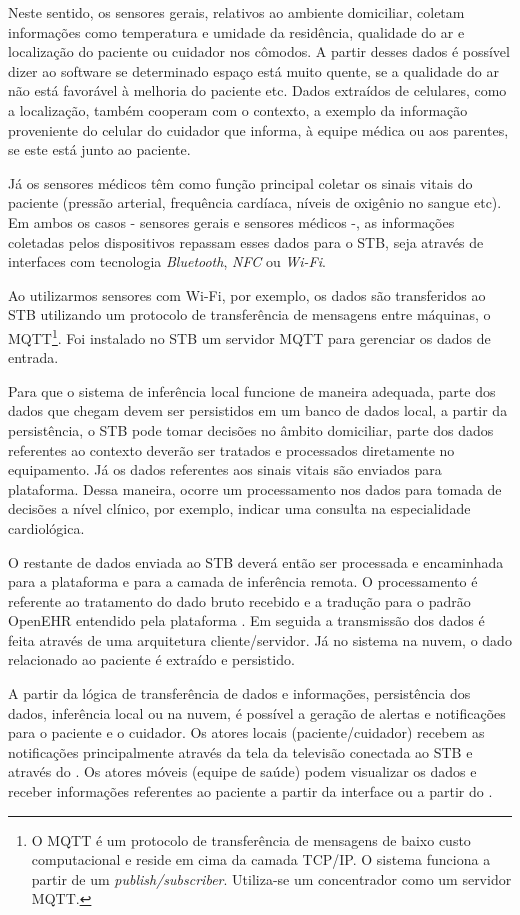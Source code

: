 Neste sentido, os sensores gerais, relativos ao ambiente domiciliar, coletam
informações como  temperatura e umidade da residência, qualidade do ar e
localização do paciente ou cuidador nos cômodos. A partir desses dados é
possível dizer ao software se determinado espaço está muito quente, se a
qualidade do ar não está favorável à melhoria do paciente etc. Dados extraídos
de celulares, como a localização, também cooperam com o contexto, a exemplo da
informação proveniente do celular do cuidador que informa, à equipe médica ou
aos parentes, se este está junto ao paciente.

Já os sensores médicos têm como função principal coletar os sinais vitais do
paciente (pressão arterial, frequência cardíaca, níveis de oxigênio no sangue
etc). Em ambos os casos - sensores gerais e sensores médicos -, as informações
coletadas pelos dispositivos repassam  esses dados para o STB, seja através de
interfaces com tecnologia  \textit{Bluetooth}, \textit{NFC} ou \textit{Wi-Fi}.

Ao utilizarmos sensores com Wi-Fi, por exemplo, os dados são transferidos ao
STB utilizando um protocolo de transferência de mensagens entre máquinas, o
MQTT\footnote{O MQTT é um protocolo de transferência de mensagens de baixo
custo computacional e reside em cima da camada TCP/IP. O sistema funciona a
partir de um \textit{publish/subscriber}. Utiliza-se um concentrador como um
servidor MQTT.}.  Foi instalado no STB um servidor MQTT para gerenciar os dados
de entrada.

Para que o sistema de inferência local funcione de maneira adequada, parte dos
dados que chegam devem ser persistidos em um banco de dados local, a partir da
persistência, o STB pode tomar decisões no âmbito domiciliar, parte dos dados
referentes ao contexto deverão ser tratados e processados diretamente no
equipamento.  Já os dados referentes aos sinais vitais são enviados para
plataforma. Dessa maneira, ocorre um processamento nos dados para tomada de
decisões a nível clínico, por exemplo, indicar uma consulta na especialidade
cardiológica.

O restante de dados enviada ao STB deverá então ser processada e encaminhada
para a plataforma \nextsaude[] e para a camada de inferência remota.  O
processamento é referente ao tratamento do dado bruto recebido e a tradução
para o padrão OpenEHR entendido pela plataforma \nextsaude[]. Em seguida a
transmissão dos dados é feita através de uma arquitetura  cliente/servidor. Já
no sistema na nuvem, o dado relacionado ao paciente é extraído e persistido.

A partir da lógica de transferência de dados e informações, persistência
dos dados, inferência local ou na nuvem, é possível a geração de alertas e
notificações para o paciente e o cuidador. Os atores locais (paciente/cuidador) 
recebem as notificações principalmente através da tela da televisão conectada ao 
STB e através do \smartphone. Os atores móveis (equipe de saúde) podem visualizar 
os dados e receber informações referentes ao paciente a partir da interface \web ou 
a partir do \smartphone.



